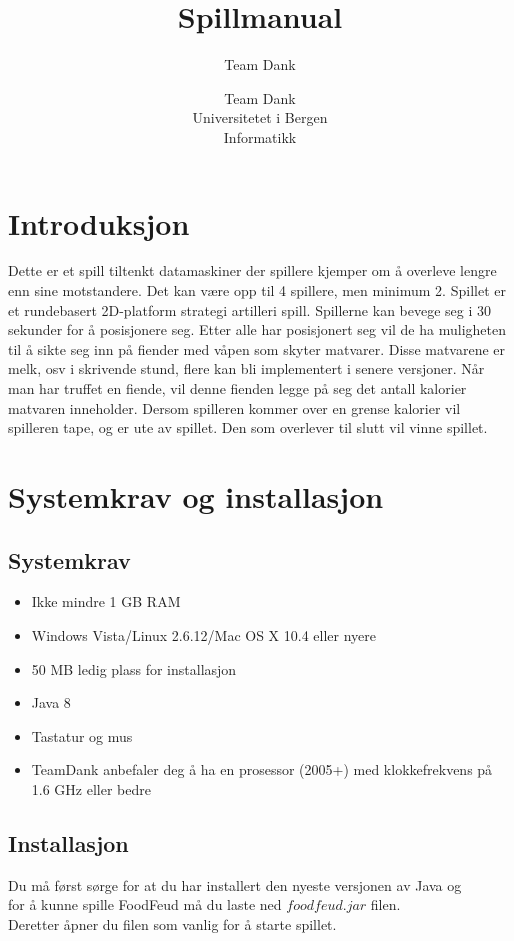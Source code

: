 \documentclass[paper=a4]{article}
\title{Spillmanual}
\author{Team Dank}
\begin{document}
\author{Team Dank \\
Universitetet i Bergen \\
Informatikk}
\maketitle
\newpage
\tableofcontents
\newpage

\section{Introduksjon}
Dette er et spill tiltenkt datamaskiner der spillere kjemper om å overleve lengre enn sine motstandere. Det kan være opp til 4 spillere, men minimum 2. 
Spillet er et rundebasert 2D-platform strategi artilleri spill. Spillerne kan bevege seg i 30 sekunder for å posisjonere seg. 
Etter alle har posisjonert seg vil de ha muligheten til å sikte seg inn på fiender med våpen som skyter matvarer. 
Disse matvarene er melk, osv i skrivende stund, flere kan bli implementert i senere versjoner. %
Når man har truffet en fiende, vil denne fienden legge på seg det antall kalorier matvaren inneholder. 
Dersom spilleren kommer over en grense kalorier vil spilleren tape, og er ute av spillet. Den som overlever til slutt vil vinne spillet.


\section{Systemkrav og installasjon}

\subsection{Systemkrav}
\begin{itemize}
	\item{Ikke mindre 1 GB RAM}
	\item{Windows Vista/Linux 2.6.12/Mac OS X 10.4 eller nyere}
	\item{50 MB ledig plass for installasjon}
	\item{Java 8}
	\item{Tastatur og mus}
	\item{TeamDank anbefaler deg å ha en prosessor (2005+) med klokkefrekvens på 1.6 GHz eller bedre}
\end{itemize}

\subsection{Installasjon}
Du må først sørge for at du har installert den nyeste versjonen av Java og \\
for å kunne spille FoodFeud må du laste ned $foodfeud.jar$ filen. \\
Deretter åpner du filen som vanlig for å starte spillet.  
\newpage
\end{document}
